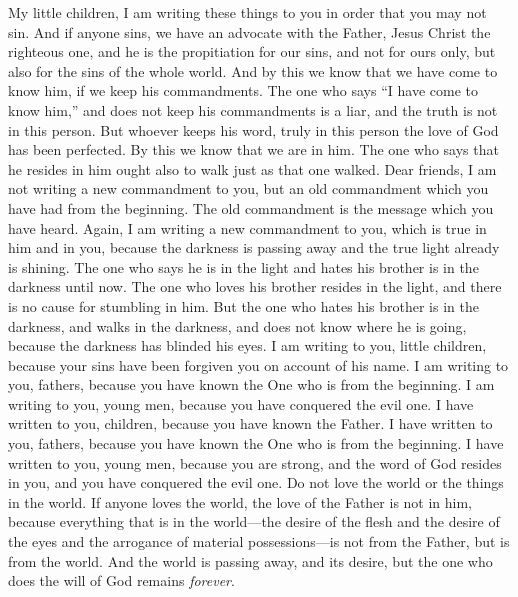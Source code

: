 \begin{biblechapter} %
 My little children, I am writing these things to you in order that you may not sin. And if anyone sins, we have an advocate with the Father, Jesus Christ the righteous one,
\verse and he is the propitiation for our sins, and not for ours only, but also for the sins of the whole world.
\verse And by this we know that we have come to know him, if we keep his commandments.
\verse The one who says “I have come to know him,” and does not keep his commandments is a liar, and the truth is not in this person.
\verse But whoever keeps his word, truly in this person the love of God has been perfected. By this we know that we are in him.
\verse The one who says that he resides in him ought also to walk just as that one walked.
\verse Dear friends, I am not writing a new commandment to you, but an old commandment which you have had from the beginning. The old commandment is the message which you have heard.
\verse Again, I am writing a new commandment to you, which is true in him and in you, because the darkness is passing away and the true light already is shining.
\verse The one who says he is in the light and hates his brother is in the darkness until now.
\verse The one who loves his brother resides in the light, and there is no cause for stumbling in him.
\verse But the one who hates his brother is in the darkness, and walks in the darkness, and does not know where he is going, because the darkness has blinded his eyes.
 I am writing to you, little children, because your sins have been forgiven you on account of his name.
\verse I am writing to you, fathers, because you have known the One who is from the beginning. I am writing to you, young men, because you have conquered the evil one.
\verse I have written to you, children, because you have known the Father. I have written to you, fathers, because you have known the One who is from the beginning. I have written to you, young men, because you are strong, and the word of God resides in you, and you have conquered the evil one.
 Do not love the world or the things in the world. If anyone loves the world, the love of the Father is not in him,
\verse because everything that is in the world—the desire of the flesh and the desire of the eyes and the arrogance of material possessions—is not from the Father, but is from the world.
\verse And the world is passing away, and its desire, but the one who does the will of God remains \textit{forever}.

\end{biblechapter}
